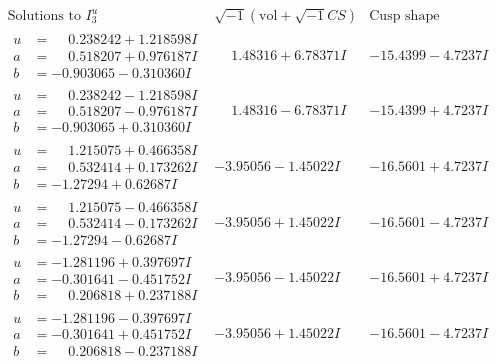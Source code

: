 \documentclass[1p]{elsarticle_modified}
\theoremstyle{definition}
\newcommand{\I}{\sqrt{-1}}
\begin{document}
$$\begin{array}{c|c|c}  
\text{Solutions to }I^u_{3}& \I (\text{vol} + \sqrt{-1}CS) & \text{Cusp shape}\\
 \hline 
\begin{aligned}
u &= \phantom{-}0.238242 + 1.218598 I \\
a &= \phantom{-}0.518207 + 0.976187 I \\
b &= -0.903065 - 0.310360 I\end{aligned}
 & \phantom{-}1.48316 + 6.78371 I & -15.4399 - 4.7237 I \\ \hline\begin{aligned}
u &= \phantom{-}0.238242 - 1.218598 I \\
a &= \phantom{-}0.518207 - 0.976187 I \\
b &= -0.903065 + 0.310360 I\end{aligned}
 & \phantom{-}1.48316 - 6.78371 I & -15.4399 + 4.7237 I \\ \hline\begin{aligned}
u &= \phantom{-}1.215075 + 0.466358 I \\
a &= \phantom{-}0.532414 + 0.173262 I \\
b &= -1.27294 + 0.62687 I\end{aligned}
 & -3.95056 - 1.45022 I & -16.5601 + 4.7237 I \\ \hline\begin{aligned}
u &= \phantom{-}1.215075 - 0.466358 I \\
a &= \phantom{-}0.532414 - 0.173262 I \\
b &= -1.27294 - 0.62687 I\end{aligned}
 & -3.95056 + 1.45022 I & -16.5601 - 4.7237 I \\ \hline\begin{aligned}
u &= -1.281196 + 0.397697 I \\
a &= -0.301641 - 0.451752 I \\
b &= \phantom{-}0.206818 + 0.237188 I\end{aligned}
 & -3.95056 - 1.45022 I & -16.5601 + 4.7237 I \\ \hline\begin{aligned}
u &= -1.281196 - 0.397697 I \\
a &= -0.301641 + 0.451752 I \\
b &= \phantom{-}0.206818 - 0.237188 I\end{aligned}
 & -3.95056 + 1.45022 I & -16.5601 - 4.7237 I \\ \hline\begin{aligned}

\end{aligned}
\end{array}$$
\end{document}
